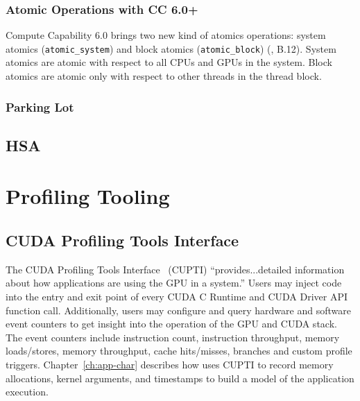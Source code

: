 \subsubsection{Atomic Operations with CC 6.0+}

Compute Capability 6.0 brings two new kind of atomics operations: system atomics (\texttt{atomic\*\_system}) and block atomics (\texttt{atomic\*\_block}) (\cite{nvidia2017cuda80}, B.12).
System atomics are atomic with respect to all CPUs and GPUs in the system.
Block atomics are atomic only with respect to other threads in the thread block.

\subsubsection{Parking Lot}



\subsection{HSA}
\label{sec:hsa}


\section{Profiling Tooling}

\subsection{CUDA Profiling Tools Interface}
\label{sec:cupti}

The CUDA Profiling Tools Interface~\cite{nvidia2017cupti} (CUPTI) ``provides...detailed information about how applications are using the GPU in a system.''
Users may inject code into the entry and exit point of every CUDA C Runtime and CUDA Driver API function call.
Additionally, users may configure and query hardware and software event counters to get insight into the operation of the GPU and CUDA stack.
The event counters include instruction count, instruction throughput, memory loads/stores, memory throughput, cache hits/misses, branches and custom profile triggers.
Chapter~\ref{ch:app-char} describes how  uses CUPTI to record memory allocations, kernel arguments, and timestamps to build a model of the application execution.

